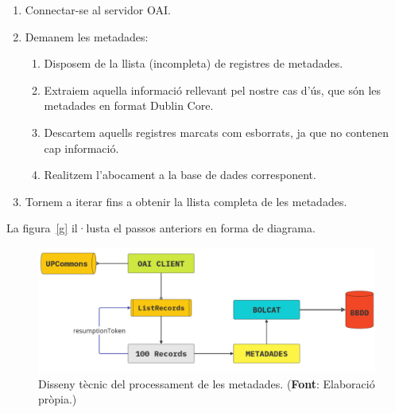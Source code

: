 \begin{enumerate}
    \item Connectar-se al servidor \gls{OAI}.
    \item Demanem les metadades:
    \begin{enumerate}
        \item Disposem de la llista (incompleta) de registres de metadades.
        \item Extraiem aquella informació rellevant pel nostre cas d'ús, que són les metadades en format Dublin Core.
        \item Descartem aquells registres marcats com esborrats, ja que no contenen cap informació.
        \item Realitzem l'abocament a la base de dades corresponent.
    \end{enumerate}
    \item Tornem a iterar fins a obtenir la llista completa de les metadades.
\end{enumerate}

\noindent
La figura~\ref{g} il·lusta el passos anteriors en forma de diagrama.

\begin{figure}[htbp]
    \centerline{\includegraphics[width=1\textwidth]{figures/metadata-processing}}
    \captionsetup{justification=centering}
    \caption[Disseny tècnic del processament de les metadades.]{Disseny tècnic del processament de les metadades. (\textbf{Font}: Elaboració pròpia.)}\label{fig:metadata-processing-workflow}
\end{figure}
